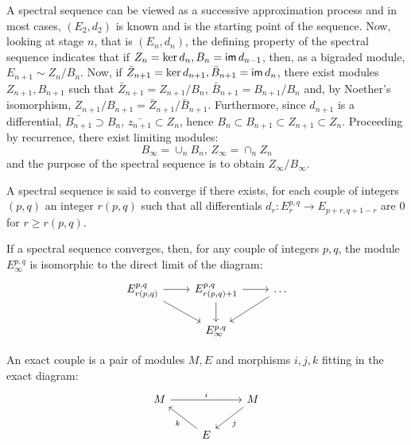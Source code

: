 \begin{rem}
    A spectral sequence can be viewed as a successive approximation process and in most cases, $(E_2,d_2)$ is known and is the starting point of the sequence. Now, looking at stage $n$, that is $(E_n, d_n)$, the defining property of the spectral sequence indicates that if $Z_n = \ker d_n, B_n = \operatorname{\textsf{im}} d_{n-1}$, then, as a bigraded module, $E_{n+1} \sim Z_n / B_n.$ Now, if $\bar{Z}_{n+1} = \ker d_{n+1}, \bar{B}_{n+1}=\operatorname{\textsf{im}} d_n$, there exist modules $Z_{n+1},B_{n+1}$ such that $\bar{Z}_{n+1} = Z_{n+1}/B_{n}$, $\bar{B}_{n+1} = B_{n+1}/B_n$ and, by Noether's isomorphism, $Z_{n+1}/B_{n+1} = \bar{Z}_{n+1}/\bar{B}_{n+1}.$ Furthermore, since $d_{n+1}$ is a differential, $\bar{B_{n+1}} \supset B_n, \, \bar{z_{n+1}} \subset Z_n$, hence $B_n \subset B_{n+1} \subset Z_{n+1} \subset Z_n.$ Proceeding by recurrence, there exist limiting modules:
    \[
    B_\infty = \cup_n B_n, \, Z_\infty = \cap_n Z_n
    \]
    and the purpose of the spectral sequence is to obtain $Z_\infty / B_\infty.$
\end{rem}
\begin{defn}
A spectral sequence is said to converge if there exists, for each couple of integers $(p,q)$ an integer $r(p,q)$ such that all differentials $d_r \colon E^{p,q}_r \to E_{p+r,q+1-r}$ are $0$ for $r \geq r(p,q).$
\end{defn}
\begin{prop}
\label{prop:spectral_limit}
If a spectral sequence converges, then, for any couple of integers $p,q$, the module 
$E_\infty^{p,q}$ is isomorphic to the direct limit of the diagram:
\begin{equation}
\label{eq:spectral_limit}
    \begin{tikzcd}
        E_{r(p,q)}^{p,q} \ar[r] \ar[rd] & E_{r(p,q)+1}^{p,q} \ar[r] \ar[d]& \dots \ar[ld] \\
        & E_\infty^{p,q} & 
    \end{tikzcd}
\end{equation}
\end{prop}
\begin{defn}
    \label{def:exact_couple}
An exact couple is a pair of modules $M,E$ and morphisms $i,j,k$ fitting in the exact diagram:
\begin{equation}
    \label{eq:exact_couple}
    \begin{tikzcd}
        M \ar[rr,"i"] & & M \ar[ld,"j"] \\
        & E \ar[lu,"k"] &
    \end{tikzcd}
\end{equation}
\end{defn}
